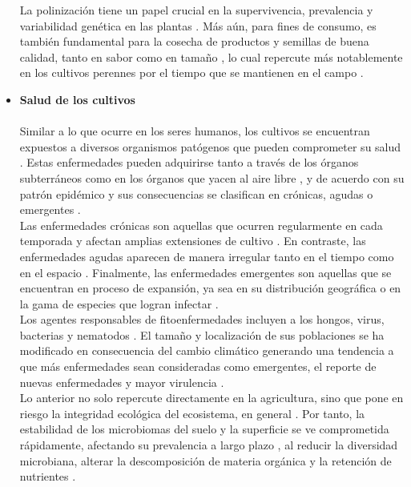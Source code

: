 \begin{itemize}[leftmargin=0cm, itemsep=0.5 cm]
{	La polinización tiene un papel crucial en la supervivencia, prevalencia y variabilidad genética en las plantas \cite{Kearns_1998}. Más aún, para fines de consumo, es también fundamental para la cosecha de productos y semillas de buena calidad, tanto en sabor como en tamaño \cite{Amrutwad_2024}, lo cual repercute más notablemente en los cultivos perennes por el tiempo que se mantienen en el campo \cite{Rafferty_2017}.\\ 
	
}
	
	\item[]\textbf{Salud de los cultivos\\}\\
	Similar a lo que ocurre en los seres humanos, los cultivos se encuentran expuestos a diversos organismos patógenos que pueden comprometer su salud \cite{Savary_2020}. Estas enfermedades pueden adquirirse tanto a través de los órganos subterráneos \cite{Katan_2017} como en los órganos que yacen al aire libre \cite{Aylor_2003}, y de acuerdo con su patrón epidémico y sus consecuencias se clasifican en crónicas, agudas o emergentes \cite{Savary_2017}.\\
	
	Las enfermedades crónicas son aquellas que ocurren regularmente en cada temporada y afectan amplias extensiones de cultivo \cite{Zadoks_1979}. En contraste, las enfermedades agudas aparecen de manera irregular tanto en el tiempo como en el espacio \cite{Savary_2020, Zadoks_1979}. Finalmente, las enfermedades emergentes son aquellas que se encuentran en proceso de expansión, ya sea en su distribución geográfica o en la gama de especies que logran infectar \cite{Anderson_2004}.\\
	
	Los agentes responsables de fitoenfermedades incluyen a los hongos, virus, bacterias y nematodos  \cite{Savary_2017B}. El tamaño y localización de sus poblaciones se ha modificado en consecuencia del cambio climático generando una tendencia a que más enfermedades sean consideradas como emergentes, el reporte de nuevas enfermedades y mayor virulencia \cite{Lahlali_2024}.\\
	
	Lo anterior no solo repercute directamente en la agricultura, sino que pone en riesgo la integridad ecológica del ecosistema, en general \cite{Lahlali_2024}. Por tanto, la estabilidad de los microbiomas del suelo y la superficie se ve comprometida rápidamente, afectando su prevalencia a largo plazo \cite{Jansson_2020}, al reducir la diversidad microbiana, alterar la descomposición de materia orgánica y la retención de nutrientes \cite{Iqbal_2025}.\\	
	

\end{itemize}
